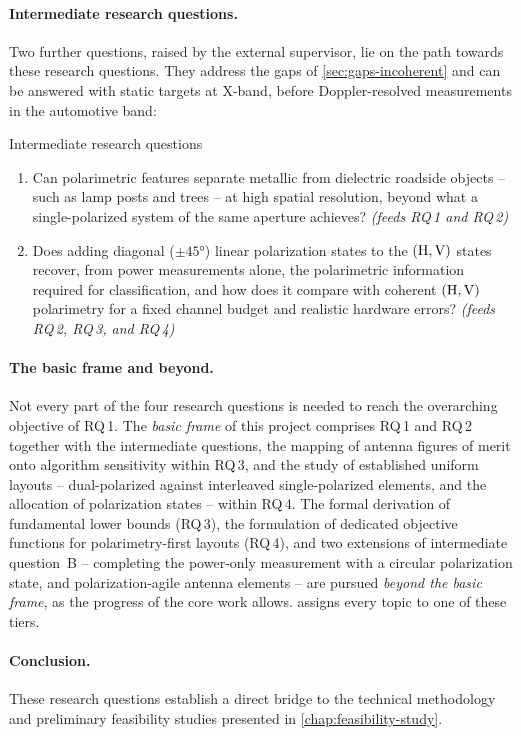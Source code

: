\paragraph{Intermediate research questions.}
Two further questions, raised by the external supervisor, lie on the path towards these research questions.
They address the gaps of \cref{sec:gaps-incoherent} and can be answered with static targets at X-band, before Doppler-resolved measurements in the automotive band:

\begin{custombox}{Intermediate research questions}
    \begin{enumerate}[label=\Alph*.]
        \item {Can polarimetric features separate metallic from dielectric roadside objects -- such as lamp posts and trees -- at high spatial resolution, beyond what a single-polarized system of the same aperture achieves? \hfill \textit{(feeds RQ\,1 and RQ\,2)}}
        \item {Does adding diagonal ($\pm\ang{45}$) linear polarization states to the $(\mathrm{H}, \mathrm{V})$ states recover, from power measurements alone, the polarimetric information required for classification, and how does it compare with coherent $(\mathrm{H}, \mathrm{V})$ polarimetry for a fixed channel budget and realistic hardware errors? \hfill \textit{(feeds RQ\,2, RQ\,3, and RQ\,4)}}
    \end{enumerate}
\end{custombox}

\paragraph{The basic frame and beyond.}
Not every part of the four research questions is needed to reach the overarching objective of RQ\,1.
The \emph{basic frame} of this project comprises RQ\,1 and RQ\,2 together with the intermediate questions, the mapping of antenna figures of merit onto algorithm sensitivity within RQ\,3, and the study of established uniform layouts -- dual-polarized against interleaved single-polarized elements, and the allocation of polarization states -- within RQ\,4.
The formal derivation of fundamental lower bounds (RQ\,3), the formulation of dedicated objective functions for polarimetry-first layouts (RQ\,4), and two extensions of intermediate question~B -- completing the power-only measurement with a circular polarization state, and polarization-agile antenna elements -- are pursued \emph{beyond the basic frame}, as the progress of the core work allows.
 assigns every topic to one of these tiers.

\paragraph{Conclusion.}
These research questions establish a direct bridge to the technical methodology and preliminary feasibility studies presented in \cref{chap:feasibility-study}.
